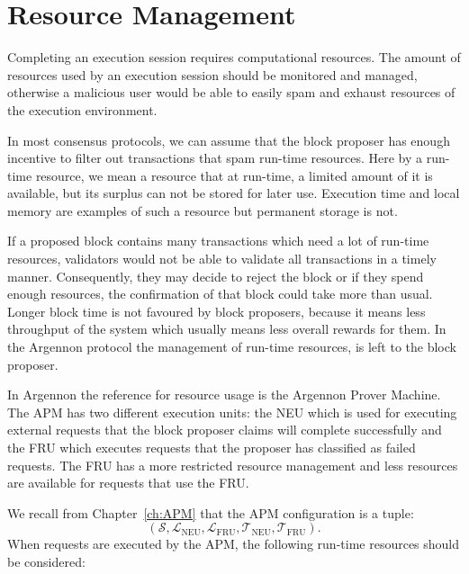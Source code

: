\section{Resource Management}\label{sec:res-man}

Completing an execution session requires computational resources. The amount of resources used by an execution session
should be monitored and managed, otherwise a malicious user would be able to easily spam and exhaust resources of the
execution environment.

In most consensus protocols, we can assume that the block proposer has enough incentive to filter out transactions
that spam run-time resources. Here by a run-time resource, we mean a resource that at run-time, a limited amount
of it is available, but its surplus can not be stored for later use. Execution time and local memory are
examples of such a resource but permanent storage is not.

If a proposed block contains many transactions which need a lot of run-time resources, validators would not
be able to validate all transactions in a timely manner. Consequently, they may decide to reject the block or if they
spend enough resources, the confirmation of that block could take more than usual. Longer block time is not
favoured by block proposers, because it means less throughput of the system which usually means less overall rewards
for them. In the Argennon protocol the management of run-time resources, is left to the block proposer.

In Argennon the reference for resource usage is the Argennon Prover Machine. The APM has two different execution
units: the NEU which is used for executing external requests that the block proposer claims will complete
successfully and the FRU which executes requests that the proposer has classified as failed requests. The FRU has a
more restricted resource management and less resources are available for requests that use the FRU.

We recall from Chapter~\ref{ch:APM} that the APM configuration is a tuple:
\[
(\mathcal{S},\mathcal{L}_{\text{NEU}},\mathcal{L}_{\text{FRU}},\mathcal{T}_{\text{NEU}},\mathcal{T}_{\text{FRU}}).
\]
When requests are executed by the APM, the following run-time resources should be considered:

